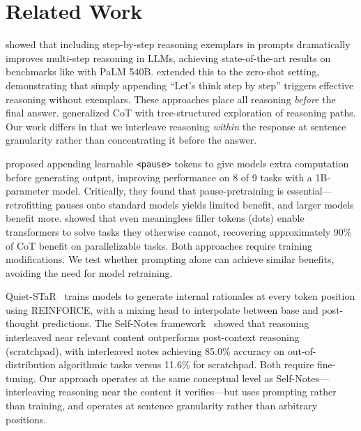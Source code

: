 \section{Related Work}
\label{sec:related}

\citet{wei2022chain} showed that including step-by-step reasoning exemplars in prompts dramatically improves multi-step reasoning in LLMs, achieving state-of-the-art results on benchmarks like \gsm with PaLM 540B. \citet{kojima2022large} extended this to the zero-shot setting, demonstrating that simply appending ``Let's think step by step'' triggers effective reasoning without exemplars. These approaches place all reasoning \emph{before} the final answer. \citet{yao2023tree} generalized CoT with tree-structured exploration of reasoning paths. Our work differs in that we interleave reasoning \emph{within} the response at sentence granularity rather than concentrating it before the answer.

\citet{goyal2023think} proposed appending learnable \texttt{<pause>} tokens to give models extra computation before generating output, improving performance on 8 of 9 tasks with a 1B-parameter model. Critically, they found that pause-pretraining is essential---retrofitting pauses onto standard models yields limited benefit, and larger models benefit more. \citet{pfau2024lets} showed that even meaningless filler tokens (dots) enable transformers to solve tasks they otherwise cannot, recovering approximately 90\% of CoT benefit on parallelizable tasks. Both approaches require training modifications. We test whether prompting alone can achieve similar benefits, avoiding the need for model retraining.

Quiet-STaR~\cite{zelikman2024quietstar} trains models to generate internal rationales at every token position using REINFORCE, with a mixing head to interpolate between base and post-thought predictions. The Self-Notes framework~\cite{lanchantin2023selfnotes} showed that reasoning interleaved near relevant content outperforms post-context reasoning (scratchpad), with interleaved notes achieving 85.0\% accuracy on out-of-distribution algorithmic tasks versus 11.6\% for scratchpad. Both require fine-tuning. Our approach operates at the same conceptual level as Self-Notes---interleaving reasoning near the content it verifies---but uses prompting rather than training, and operates at sentence granularity rather than arbitrary positions.


